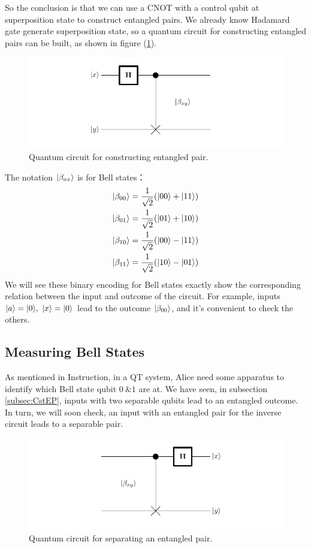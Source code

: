 		So the conclusion is that we can use a CNOT with a control qubit at superposition state 
		to construct entangled pairs. We already know Hadamard gate generate 
		superposition state, so a quantum circuit\cite{book:IT} for constructing entangled 
		pairs can be built, as shown in figure (\ref{img:constructEntangle}).
		\begin{figure}
		\includegraphics[scale=0.7]{img/entangled_pair-1.pdf}
		\caption{Quantum circuit for constructing entangled pair.}
		\label{img:constructEntangle}
		\end{figure}

		The notation $|{\beta_{ax}} \rangle$ is for Bell states：
		\begin{align}
		|{\beta_{00}} \rangle = \frac{1}{\sqrt{2}} (|{00} \rangle+|{11} \rangle)\\
		|{\beta_{01}} \rangle = \frac{1}{\sqrt{2}} (|{01} \rangle+|{10} \rangle)\\
		|{\beta_{10}} \rangle = \frac{1}{\sqrt{2}} (|{00} \rangle-|{11} \rangle)\\
		|{\beta_{11}} \rangle = \frac{1}{\sqrt{2}} (|{10} \rangle-|{01} \rangle)
		\end{align}
		We will see these binary encoding for Bell states exactly show the corresponding
		relation between the input and outcome of the circuit. For example, inputs 
		$|{a} \rangle = |{0} \rangle,\ |{x} \rangle=|{0} \rangle$ lead to the outcome $|{\beta_{00}} \rangle$, and it's convenient to check the others.

	\subsection{Measuring Bell States}
		As mentioned in Instruction, in a QT system, Alice need some apparatus to 
		identify which Bell state qubit $0\ \& 1$ are at. 
		We have seen, in subsection \ref{subsec:CstEP}, inputs with two separable qubits
		lead to an entangled outcome. In turn, we will soon check, an input with an entangled pair for the inverse circuit leads to a separable pair.
		\begin{figure}
		\centering
		\includegraphics[scale=0.7]{img/separable_pair-1.pdf}
		\caption{Quantum circuit for separating an entangled pair.}
		\label{img:separateEntangle}
		\end{figure}

